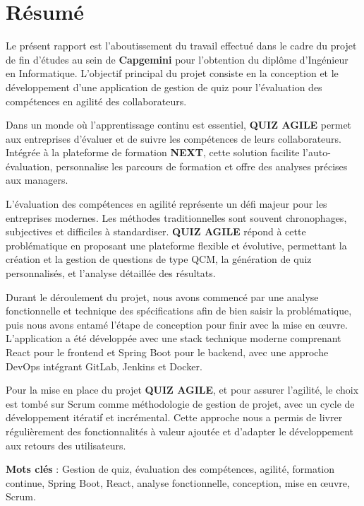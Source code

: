 \documentclass[12pt,a4paper]{report}
\begin{document}
\cleardoublepage
{}
\chapter*{Résumé}

Le présent rapport est l'aboutissement du travail effectué dans le cadre du projet de fin d'études au sein de \textbf{Capgemini} pour l'obtention du diplôme d'Ingénieur en Informatique. L'objectif principal du projet consiste en la conception et le développement d'une application de gestion de quiz pour l'évaluation des compétences en agilité des collaborateurs.

Dans un monde où l'apprentissage continu est essentiel, \textbf{QUIZ AGILE} permet aux entreprises d'évaluer et de suivre les compétences de leurs collaborateurs. Intégrée à la plateforme de formation \textbf{NEXT}, cette solution facilite l'auto-évaluation, personnalise les parcours de formation et offre des analyses précises aux managers.

L'évaluation des compétences en agilité représente un défi majeur pour les entreprises modernes. Les méthodes traditionnelles sont souvent chronophages, subjectives et difficiles à standardiser. \textbf{QUIZ AGILE} répond à cette problématique en proposant une plateforme flexible et évolutive, permettant la création et la gestion de questions de type QCM, la génération de quiz personnalisés, et l'analyse détaillée des résultats.

Durant le déroulement du projet, nous avons commencé par une analyse fonctionnelle et technique des spécifications afin de bien saisir la problématique, puis nous avons entamé l'étape de conception pour finir avec la mise en œuvre. L'application a été développée avec une stack technique moderne comprenant React pour le frontend et Spring Boot pour le backend, avec une approche DevOps intégrant GitLab, Jenkins et Docker.

Pour la mise en place du projet \textbf{QUIZ AGILE}, et pour assurer l'agilité, le choix est tombé sur Scrum comme méthodologie de gestion de projet, avec un cycle de développement itératif et incrémental. Cette approche nous a permis de livrer régulièrement des fonctionnalités à valeur ajoutée et d'adapter le développement aux retours des utilisateurs.

\textbf{Mots clés} : Gestion de quiz, évaluation des compétences, agilité, formation continue, Spring Boot, React, analyse fonctionnelle, conception, mise en œuvre, Scrum.
\end{document}
